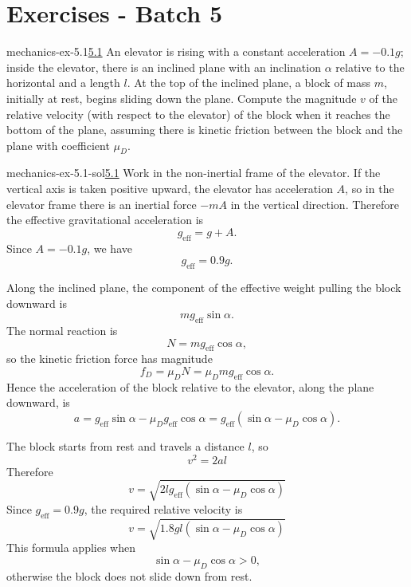 \documentclass[preview]{standalone}
\begin{document}
\genpage

\section{Exercises - Batch 5}

\begin{snippetexercise}{mechanics-ex-5.1}{\underline{5.1}}
    An elevator is rising with a constant acceleration \( A = -0.1g \); inside the elevator, there is an inclined plane with an inclination \( \alpha \) relative to the horizontal and a length \( l \). At the top of the inclined plane, a block of mass \( m \), initially at rest, begins sliding down the plane. Compute the magnitude \( v \) of the relative velocity (with respect to the elevator) of the block when it reaches the bottom of the plane, assuming there is kinetic friction between the block and the plane with coefficient \( \mu_D \).
\end{snippetexercise}

\begin{snippetsolution}{mechanics-ex-5.1-sol}{\underline{5.1}}
    Work in the non-inertial frame of the elevator. If the vertical axis is taken
    positive upward, the elevator has acceleration \(A\), so in the elevator frame
    there is an inertial force \(-mA\) in the vertical direction. Therefore the
    effective gravitational acceleration is
    \[
        g_{\mathrm{eff}} = g + A .
    \]
    Since \(A=-0.1g\), we have
    \[
        g_{\mathrm{eff}} = 0.9g .
    \]

    Along the inclined plane, the component of the effective weight pulling the
    block downward is
    \[
        mg_{\mathrm{eff}}\sin\alpha .
    \]
    The normal reaction is
    \[
        N = mg_{\mathrm{eff}}\cos\alpha ,
    \]
    so the kinetic friction force has magnitude
    \[
        f_D = \mu_D N = \mu_D mg_{\mathrm{eff}}\cos\alpha .
    \]
    Hence the acceleration of the block relative to the elevator, along the plane
    downward, is
    \[
        a
        =
        g_{\mathrm{eff}}\sin\alpha
        -
        \mu_D g_{\mathrm{eff}}\cos\alpha
        =
        g_{\mathrm{eff}}\left(\sin\alpha-\mu_D\cos\alpha\right).
    \]

    The block starts from rest and travels a distance \(l\), so
    \[
        v^2 = 2al
    \]
    Therefore
    \[
        v
        =
        \sqrt{
            2lg_{\mathrm{eff}}
            \left(\sin\alpha-\mu_D\cos\alpha\right)
        }
    \]
    Since \(g_{\mathrm{eff}}=0.9g\), the required relative velocity is
    \[
        v
        =
        \sqrt{
            1.8gl
            \left(\sin\alpha-\mu_D\cos\alpha\right)
        }
    \]
    This formula applies when
    \[
        \sin\alpha-\mu_D\cos\alpha > 0,
    \]
    otherwise the block does not slide down from rest.
\end{snippetsolution}
\end{document}
